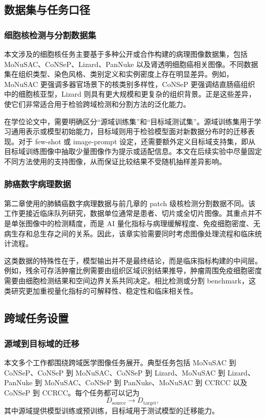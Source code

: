 \subsection{数据集与任务口径}
\subsubsection{细胞核检测与分割数据集}
本文涉及的细胞核任务主要基于多种公开或合作构建的病理图像数据集，包括 MoNuSAC、CoNSeP、Lizard、PanNuke 以及肾透明细胞癌相关图像。不同数据集在组织类型、染色风格、类别定义和实例密度上存在明显差异。例如，MoNuSAC 更强调多器官场景下的核类别多样性，CoNSeP 更强调结直肠癌组织中的细胞核亚型，Lizard 则具有更大规模和更复杂的组织背景。正是这些差异，使它们非常适合用于检验跨域检测和分割方法的泛化能力。

在学位论文中，需要明确区分“源域训练集”和“目标域测试集”。源域训练集用于学习通用表示或模型初始能力，目标域则用于检验模型面对新数据分布时的迁移表现。对于 few-shot 或 image-prompt 设定，还需要额外定义目标域支持集，即从目标域训练图像中抽取少量图像作为提示或适配信息。本文在后续实验中尽量固定不同方法使用的支持图像，从而保证比较结果不受随机抽样差异影响。

\subsubsection{肺癌数字病理数据}
第二章使用的肺鳞癌数字病理数据与前几章的 patch 级核检测分割数据不同。该工作更接近临床队列研究，数据单位通常是患者、切片或全切片图像。其重点并不是单张图像中的检测精度，而是 AI 量化指标与病理缓解程度、免疫细胞密度、无病生存和总生存之间的关系。因此，该章实验需要同时考虑图像处理流程和临床统计流程。

这类数据的特殊性在于，模型输出并不是最终结论，而是临床指标构建的中间层。例如，残余可存活肿瘤比例需要由组织区域识别结果推导，肿瘤周围免疫细胞密度需要由细胞检测结果和空间边界关系共同决定。相比检测或分割 benchmark，这类研究更加重视量化指标的可解释性、稳定性和临床相关性。

\subsection{跨域任务设置}
\subsubsection{源域到目标域的迁移}
本文多个工作都围绕跨域医学图像任务展开。典型任务包括 MoNuSAC 到 CoNSeP、CoNSeP 到 MoNuSAC、CoNSeP 到 Lizard、MoNuSAC 到 Lizard、PanNuke 到 MoNuSAC、CoNSeP 到 PanNuke、MoNuSAC 到 CCRCC 以及 CoNSeP 到 CCRCC。每个任务都可以记为
\[
D_{\text{source}} \rightarrow D_{\text{target}},
\]
其中源域提供模型训练或预训练，目标域用于测试模型的迁移能力。

